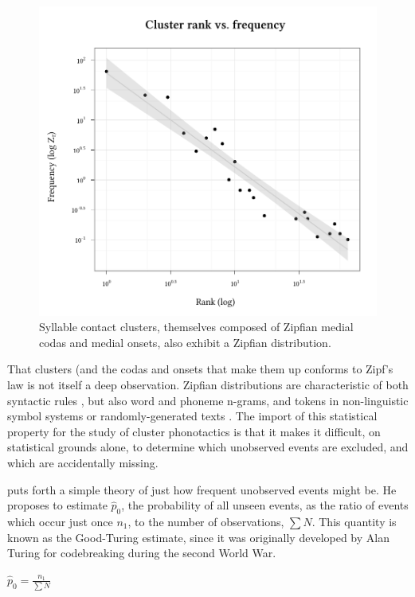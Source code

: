 \begin{figure}
\centering
\includegraphics{cluster.pdf}
\caption{Syllable contact clusters, themselves composed of Zipfian medial codas and medial onsets, also exhibit a Zipfian distribution.}
\label{clus}
\end{figure}

That clusters (and the codas and onsets that make them up conforms to Zipf's law is not itself a deep observation. Zipfian distributions are characteristic of both syntactic rules \citep{Yang2009}, but also word \citep{Teahan1998,Ha2002,Baroni2009} and phoneme \citep{Daland2011a} n-grams, and tokens in non-linguistic symbol systems \citep{Chomsky1958,Sproat2010} or randomly-generated texts \citep{Miller1957,Li1992}. The import of this statistical property for the study of cluster phonotactics is that it makes it difficult, on statistical grounds alone, to determine which unobserved events are excluded, and which are accidentally missing. 

\citet{Good1953} puts forth a simple theory of just how frequent unobserved events might be. He proposes to estimate $\hat{p}_0$, the probability of all unseen events, as the ratio of events which occur just once $n_1$, to the number of observations, $\sum N$. This quantity is known as the Good-Turing estimate, since it was originally developed by Alan Turing for codebreaking during the second World War.

\begin{unlabeledexample}
$\displaystyle \hat{p}_0 = \frac{n_1}{\sum N}$ 
\end{unlabeledexample}

